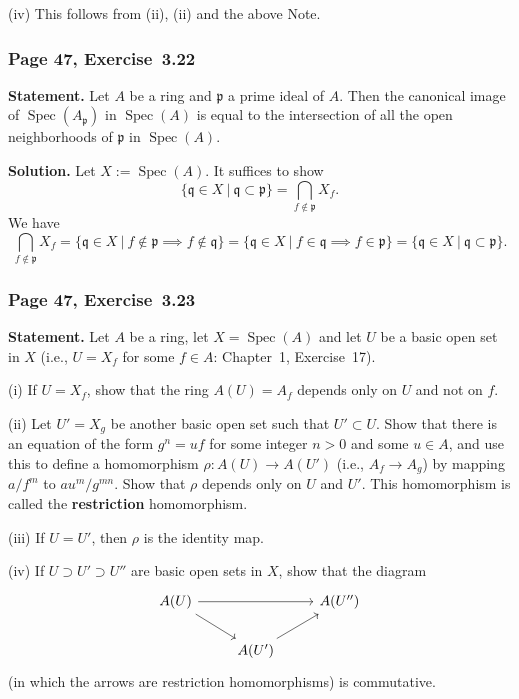 \documentclass[12pt,letterpaper]{article}%
\newcommand{\mf}{\mathfrak}
\newcommand{\ppp}{\mf p}
\newcommand{\qqq}{\mf q}
\newcommand{\Spec}{\operatorname{Spec}}\newcommand{\Sp}{\operatorname{Spec}}
\newcommand{\nn}{\noindent}
\begin{document}
\nn(iv) This follows from (ii), (ii) and the above Note.


\subsubsection{Page 47, Exercise~3.22}\label{ex3.22}%

\textbf{Statement.} Let $A$ be a ring and $\ppp$ a prime ideal of $A$. Then the canonical image of $\Spec(A_\ppp)$ in $\Spec(A)$ is equal to the intersection of all the open neighborhoods of $\ppp$ in $\Spec(A)$.

\nn\textbf{Solution.} Let $X:=\Spec(A)$. It suffices to show 
$$
\{\qqq\in X\ |\ \qqq\subset\ppp\}=\bigcap_{f\notin\ppp}X_f.
$$ 
We have 
$$
\bigcap_{f\notin\ppp}X_f=\{\qqq\in X\ |\ f\notin\ppp\implies f\notin\qqq\}=\{\qqq\in X\ |\ f\in\qqq\implies f\in\ppp\}=\{\qqq\in X\ |\ \qqq\subset\ppp\}.
$$ 

\subsubsection{Page 47, Exercise~3.23}%

\textbf{Statement.} Let $A$ be a ring, let $X=\Spec(A)$ and let $U$ be a basic open set in $X$ (i.e., $U=X_f$ for some $f\in A$: Chapter~1, Exercise~17).

\nn(i) If $U=X_f$, show that the ring $A(U)=A_f$ depends only on $U$ and not on $f$.

\nn(ii) Let $U'=X_g$ be another basic open set such that $U'\subset U$. Show that there is an equation of the form $g^n=uf$ for some integer $n>0$ and some $u\in A$, and use this to define a homomorphism $\rho:A(U)\to A(U')$ (i.e., $A_f\to A_g$) by mapping $a/f^m$ to $au^m/g^{mn}$. Show that $\rho$ depends only on $U$ and $U'$. This homomorphism is called the \textbf{restriction} homomorphism.

\nn(iii) If $U=U'$, then $\rho$ is the identity map.

\nn(iv) If $U\supset U'\supset U''$ are basic open sets in $X$, show that the diagram%
\[\begin{tikzcd}
	{A(U)} && {A(U'')} \\
	& {A(U')}
	\arrow[from=1-1, to=2-2]
	\arrow[from=1-1, to=1-3]
	\arrow[from=2-2, to=1-3]
\end{tikzcd}\]
(in which the arrows are restriction homomorphisms) is commutative.
\end{document}
